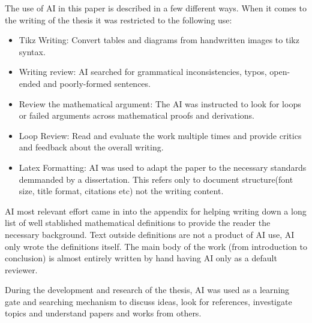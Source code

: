 The use of AI in this paper is described in a few different ways. When it comes to the writing of the thesis
it was restricted to the following use:
\begin{itemize}
    \item Tikz Writing: Convert tables and diagrams from handwritten images to tikz syntax.
    \item Writing review: AI searched for grammatical inconsistencies, typos, open-ended and poorly-formed sentences.
    \item Review the mathematical argument: The AI was instructed to look for loops or failed arguments across mathematical proofs and derivations.
    \item Loop Review: Read and evaluate the work multiple times and provide critics and feedback about the overall writing.
    \item Latex Formatting: AI was used to adapt the paper to the necessary standards demmanded by a dissertation.
        This refers only to document structure(font size, title format, citations etc) not the writing content.
\end{itemize}
AI most relevant effort came in into the appendix for helping writing down a long list
of well stablished mathematical definitions to provide the reader the necessary background. 
Text outside definitions are not a product of AI use, AI only wrote the definitions itself.
The main body of the work (from introduction to conclusion) is almost entirely written by hand
having AI only as a default reviewer.

During the development and research of the thesis, AI was used as a learning gate
and searching mechanism to discuss ideas, look for references, investigate topics and understand
papers and works from others.
